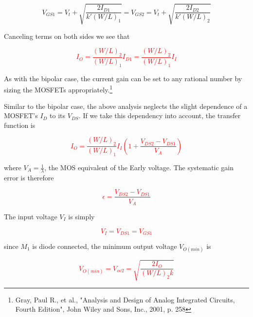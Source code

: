 \begin{equation}
V_{GS1} = V_{t} + \sqrt{\frac{2I_{D1}}{k'(W/L)_{1}}} = V_{GS2} = V_{t} + \sqrt{\frac{2I_{D2}}{k'(W/L)_{2}}}
\end{equation}

Canceling terms on both sides we see that

\textcolor{red}{
\begin{equation}
I_{O} = \frac{(W/L)_{2}}{(W/L)_{1}}I_{D1} = \frac{(W/L)_{2}}{(W/L)_{1}}I_{I}
\label{eq:MOSsimplecurrentmirror}
\end{equation}
}

As with the bipolar case, the current gain can be set to any rational number by sizing the MOSFETs appropriately.\footnote{Gray, Paul R., et al., "Analysis and Design of Analog Integrated Circuits, Fourth Edition", John Wiley and Sons, Inc., 2001, p. 258}
\par
Similar to the bipolar case, the above analysis neglects the slight dependence of a MOSFET's $I_{D}$ to its $V_{DS}$. If we take this dependency into account, the transfer function is

\textcolor{red}{
\begin{equation}
I_{O} = \frac{(W/L)_{2}}{(W/L)_{1}}I_{I}\left(1+\frac{V_{DS2}-V_{DS1}}{V_{A}}\right)
\label{eq:MOSsimplecurrentmirrorfull}
\end{equation}
}

where $V_{A} = \frac{1}{\lambda}$, the MOS equivalent of the Early voltage. The systematic gain error is therefore

\textcolor{red}{
\begin{equation}
\epsilon = \frac{V_{DS2}-V_{DS1}}{V_{A}}
\label{eq:MOSsimplecurrentmirror_sysgainerr}
\end{equation}
}

\par
The input voltage $V_{I}$ is simply

\textcolor{red}{
\begin{equation}
V_{I} = V_{DS1} = V_{GS1}
\label{eq:MOSsimplecurrentmirror_Vi}
\end{equation}
}

since $M_{1}$ is diode connected, the minimum output voltage $V_{O(min)}$ is

\textcolor{red}{
\begin{equation}
V_{O(min)} = V_{ov2} = \sqrt{\frac{2I_{O}}{(W/L)_{2}k}}
\label{eq:MOSsimplecurrentmirror_Vo}
\end{equation}
}

